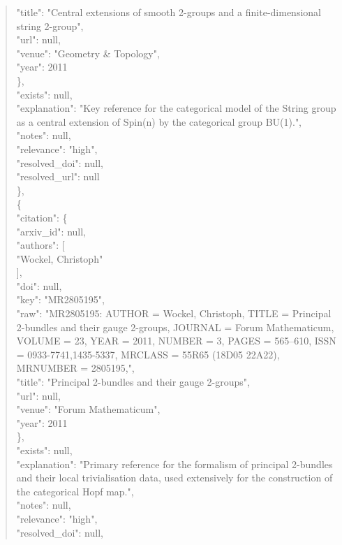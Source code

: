 \documentclass[11pt]{article}
\begin{document}
\begin{quote}
        "title": "Central extensions of smooth 2-groups and a finite-dimensional string 2-group",\\
        "url": null,\\
        "venue": "Geometry \& Topology",\\
        "year": 2011\\
      \},\\
      "exists": null,\\
      "explanation": "Key reference for the categorical model of the String group as a central extension of Spin(n) by the categorical group BU(1).",\\
      "notes": null,\\
      "relevance": "high",\\
      "resolved\_doi": null,\\
      "resolved\_url": null\\
    \},\\
    \{\\
      "citation": \{\\
        "arxiv\_id": null,\\
        "authors": [\\
          "Wockel, Christoph"\\
        ],\\
        "doi": null,\\
        "key": "MR2805195",\\
        "raw": "MR2805195: AUTHOR = Wockel, Christoph, TITLE = Principal 2-bundles and their gauge 2-groups, JOURNAL = Forum Mathematicum, VOLUME = 23, YEAR = 2011, NUMBER = 3, PAGES = 565--610, ISSN = 0933-7741,1435-5337, MRCLASS = 55R65 (18D05 22A22), MRNUMBER = 2805195,",\\
        "title": "Principal 2-bundles and their gauge 2-groups",\\
        "url": null,\\
        "venue": "Forum Mathematicum",\\
        "year": 2011\\
      \},\\
      "exists": null,\\
      "explanation": "Primary reference for the formalism of principal 2-bundles and their local trivialisation data, used extensively for the construction of the categorical Hopf map.",\\
      "notes": null,\\
      "relevance": "high",\\
      "resolved\_doi": null,\\

\end{quote}
\end{document}
